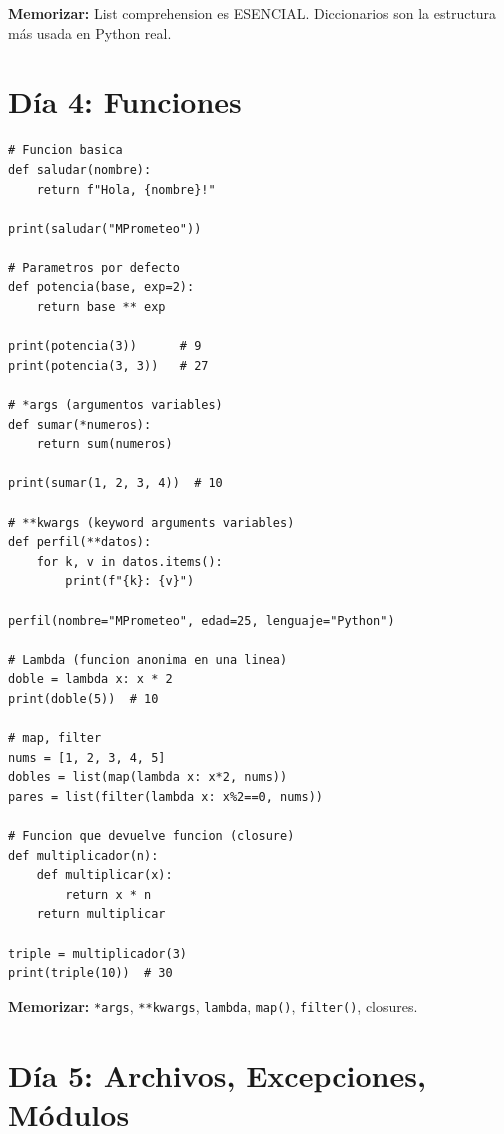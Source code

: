 \documentclass[10pt,a4paper]{article}
\begin{document}
\textbf{Memorizar:} List comprehension es ESENCIAL. Diccionarios son
la estructura m\'as usada en Python real.

\section*{D\'ia 4: Funciones}

\begin{lstlisting}
# Funcion basica
def saludar(nombre):
    return f"Hola, {nombre}!"

print(saludar("MPrometeo"))

# Parametros por defecto
def potencia(base, exp=2):
    return base ** exp

print(potencia(3))      # 9
print(potencia(3, 3))   # 27

# *args (argumentos variables)
def sumar(*numeros):
    return sum(numeros)

print(sumar(1, 2, 3, 4))  # 10

# **kwargs (keyword arguments variables)
def perfil(**datos):
    for k, v in datos.items():
        print(f"{k}: {v}")

perfil(nombre="MPrometeo", edad=25, lenguaje="Python")

# Lambda (funcion anonima en una linea)
doble = lambda x: x * 2
print(doble(5))  # 10

# map, filter
nums = [1, 2, 3, 4, 5]
dobles = list(map(lambda x: x*2, nums))
pares = list(filter(lambda x: x%2==0, nums))

# Funcion que devuelve funcion (closure)
def multiplicador(n):
    def multiplicar(x):
        return x * n
    return multiplicar

triple = multiplicador(3)
print(triple(10))  # 30
\end{lstlisting}

\textbf{Memorizar:} \texttt{*args}, \texttt{**kwargs}, \texttt{lambda},
\texttt{map()}, \texttt{filter()}, closures.

\section*{D\'ia 5: Archivos, Excepciones, M\'odulos}
\end{document}
